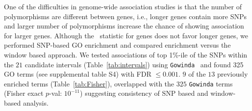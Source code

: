 One of the difficulties in genome-wide association studies is that the
number of polymorphisms are different between genes, i.e., longer
genes contain more SNPs and larger number of polymorphisms increase
the chance of showing association for larger genes.  Although the
\comale\ statistic for genes does not favor longer genes, we performed
SNP-based GO enrichment and compared enrichment versus the window
based approach. We tested associations of top 1\%-ile of the SNPs
within the $21$ candidate intervals (Table~\ref{tab:intervals}) using
\texttt{Gowinda}~\cite{kofler2012gowinda} and found 325 GO terms (see
supplemental table S4) with FDR $\le 0.001$. $9$ of the $13$
previously enriched terms (Table~\ref{tab:Fisher}), overlapped with
the $325$ \texttt{Gowinda} terms (Fisher exact $p$-val: $10^{-11}$)
suggesting consistency of SNP based and window-based analysis.

